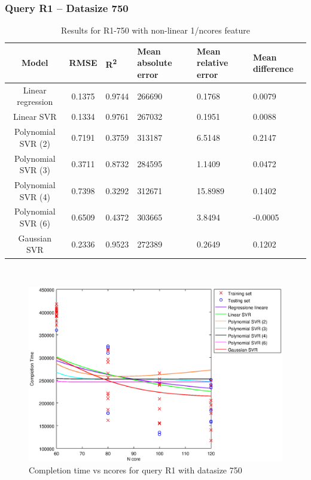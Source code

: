 \documentclass[a4paper,11pt]{article}
\begin{document}
\newpage
\subsubsection{Query R1 -- Datasize 750}
\begin{table}[H]
	\centering
	\begin{adjustbox}{center}
		\begin{tabular}{c | c M{1.2cm} M{2.5cm} M{2.5cm} M{1.8cm}}
			Model & RMSE & R\textsuperscript{2} & Mean absolute error & Mean relative error & Mean difference \tabularnewline
			\hline
			Linear regression & 0.1375 & 0.9744 & 266690 & 0.1768 & 0.0079 \\
			Linear SVR & 0.1334 & 0.9761 & 267032 & 0.1951 & 0.0088 \\
			Polynomial SVR (2) & 0.7191 & 0.3759 & 313187 & 6.5148 & 0.2147 \\
			Polynomial SVR (3) & 0.3711 & 0.8732 & 284595 & 1.1409 & 0.0472 \\
			Polynomial SVR (4) & 0.7398 & 0.3292 & 312671 & 15.8989 & 0.1402 \\
			Polynomial SVR (6) & 0.6509 & 0.4372 & 303665 & 3.8494 & -0.0005 \\
			Gaussian SVR & 0.2336 & 0.9523 & 272389 & 0.2649 & 0.1202 \\
		\end{tabular}
	\end{adjustbox}
	\\
	\caption{Results for R1-750 with non-linear 1/ncores feature}
	\label{table_R1_prediction_all}
\end{table}

\begin {figure}[hbtp]
\centering
\includegraphics[width=\textwidth]{output/R1_750_1_OVER_NCORES/plot_R1_750.eps}
\caption {Completion time vs ncores for query R1 with datasize 750}
\end {figure}
\end{document}
